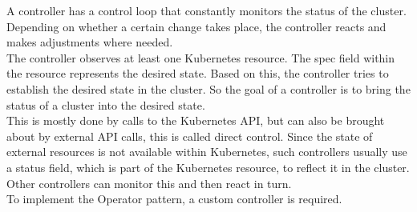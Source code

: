 A controller has a control loop that constantly monitors the status of the cluster.
Depending on whether a certain change takes place, the controller reacts and makes adjustments where needed.
\\
The controller observes at least one Kubernetes resource.
The spec field within the resource represents the desired state.
Based on this, the controller tries to establish the desired state in the cluster.
So the goal of a controller is to bring the status of a cluster into the desired state.
\\
This is mostly done by calls to the Kubernetes API, but can also be brought about by external API calls, this is called direct control.
Since the state of external resources is not available within Kubernetes, such controllers usually use a status field, which is part of the Kubernetes resource, to reflect it in the cluster.
Other controllers can monitor this and then react in turn.
\\
To implement the Operator pattern, a custom controller is required.
~\cite{KUBERNETES-CONTROLLERS}
